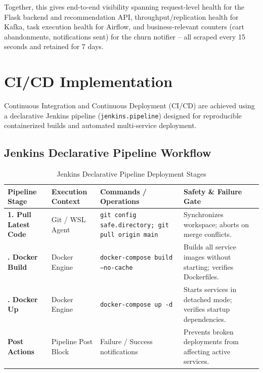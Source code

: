 \documentclass[11pt,a4paper]{article}
\begin{document}
Together, this gives end-to-end visibility spanning request-level health for the Flask backend and recommendation API, throughput/replication health for Kafka, task execution health for Airflow, and business-relevant counters (cart abandonments, notifications sent) for the churn notifier -- all scraped every 15 seconds and retained for 7 days.

\section{CI/CD Implementation}

Continuous Integration and Continuous Deployment (CI/CD) are achieved using a declarative Jenkins pipeline (\texttt{jenkins.pipeline}) designed for reproducible containerized builds and automated multi-service deployment.

\subsection{Jenkins Declarative Pipeline Workflow}

\begin{table}[h]
\centering
\small
\begin{tabularx}{\textwidth}{@{}>{\bfseries}p{3.2cm}p{2.8cm}p{5.0cm}X@{}}
\toprule
\color{DeepNavy}Pipeline Stage & \color{DeepNavy}Execution Context & \color{DeepNavy}Commands / Operations & \color{DeepNavy}Safety \& Failure Gate \\
\midrule
1. Pull Latest Code & Git / WSL Agent & \texttt{git config safe.directory; git pull origin main} & Synchronizes workspace; aborts on merge conflicts. \\
\addlinespace
2. Docker Build & Docker Engine & \texttt{docker-compose build --no-cache} & Builds all service images without starting; verifies Dockerfiles. \\
\addlinespace
3. Docker Up & Docker Engine & \texttt{docker-compose up -d} & Starts services in detached mode; verifies startup dependencies. \\
\addlinespace
Post Actions & Pipeline Post Block & Failure / Success notifications & Prevents broken deployments from affecting active services. \\
\bottomrule
\end{tabularx}
\caption{Jenkins Declarative Pipeline Deployment Stages}
\end{table}
\end{document}
